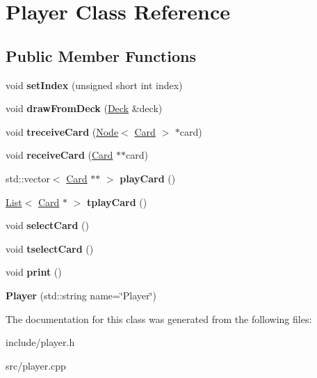 \hypertarget{classPlayer}{}\section{Player Class Reference}
\label{classPlayer}
\subsection*{Public Member Functions}
\begin{DoxyCompactItemize}
\item 
\mbox{\label{classPlayer_a5a75a83f844cc42de19a36ebcafdba7f}} 
void {\bfseries set\+Index} (unsigned short int index)
\item 
\mbox{\label{classPlayer_a09eba76a9625117574c1d854d961c1e7}} 
void {\bfseries draw\+From\+Deck} (\hyperlink{classDeck}{Deck} \&deck)
\item 
\mbox{\label{classPlayer_a2d6862603dd19998b53a93a17d917277}} 
void {\bfseries treceive\+Card} (\hyperlink{structNode}{Node}$<$ \hyperlink{classCard}{Card} $>$ $\ast$card)
\item 
\mbox{\label{classPlayer_a893031432d4bc4212d7f26f9fcef11b8}} 
void {\bfseries receive\+Card} (\hyperlink{classCard}{Card} $\ast$$\ast$card)
\item 
\mbox{\label{classPlayer_af53c36cc58b266ba4e3b670bdaa74012}} 
std\+::vector$<$ \hyperlink{classCard}{Card} $\ast$$\ast$ $>$ {\bfseries play\+Card} ()
\item 
\mbox{\label{classPlayer_ad8ffb6448467c473d9a9245441a31b4c}} 
\hyperlink{classList}{List}$<$ \hyperlink{classCard}{Card} $\ast$ $>$ {\bfseries tplay\+Card} ()
\item 
\mbox{\label{classPlayer_a9dd9d52224198075401c245828ca9e51}} 
void {\bfseries select\+Card} ()
\item 
\mbox{\label{classPlayer_a3e3cb450db73886dba2ee6c448e22493}} 
void {\bfseries tselect\+Card} ()
\item 
\mbox{\label{classPlayer_ae298148cd8152bbe1d2e237e76621ce2}} 
void {\bfseries print} ()
\item 
\mbox{\label{classPlayer_ac6f239e98158f2324a0bf4cedcc921ba}} 
{\bfseries Player} (std\+::string name=\char`\"{}Player\char`\"{})
\end{DoxyCompactItemize}


The documentation for this class was generated from the following files\+:\begin{DoxyCompactItemize}
\item 
include/player.\+h\item 
src/player.\+cpp\end{DoxyCompactItemize}
